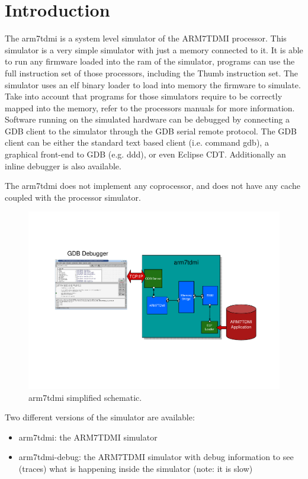 \section{Introduction}

The arm7tdmi is a system level simulator of the ARM7TDMI processor. This simulator is a very simple simulator with just a memory connected to it. It is able to run any firmware loaded into the ram of the simulator, programs can use the full instruction set of those processors, including the Thumb instruction set. The simulator uses an elf binary loader to load into memory the firmware to simulate. Take into account that programs for those simulators require to be correctly mapped into the memory, refer to the processors manuals for more information. Software running on the simulated hardware can be debugged by connecting a GDB client to the simulator through the GDB serial remote protocol. The GDB client can be either the standard text based client (i.e. command gdb), a graphical front-end to GDB (e.g. ddd), or even Eclipse CDT. Additionally an inline debugger is also available.

The arm7tdmi does not implement any coprocessor, and does not have any cache coupled with the processor simulator. 

\begin{figure}[!h]
	\begin{center}
		\includegraphics[width=\textwidth]{arm7tdmi/fig_arm7tdmi.pdf}
	\end{center}
	\caption{arm7tdmi simplified schematic.}
	\label{fig:arm7tdmi}
\end{figure}

Two different versions of the simulator are available:
\begin{itemize}
	\item arm7tdmi: the ARM7TDMI simulator
    \item arm7tdmi-debug: the ARM7TDMI simulator with debug information to see (traces) what is happening inside the simulator (note: it is slow)
\end{itemize}

